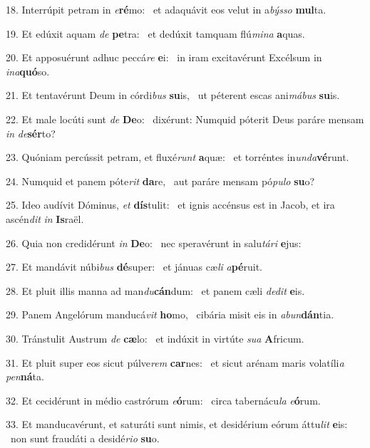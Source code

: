 18. Interrúpit petram in \textit{e}\textbf{ré}mo: \ast\  et adaquávit eos velut in a\textit{býs}\textit{so} \textbf{mul}ta.\

19. Et edúxit aquam \textit{de} \textbf{pe}tra: \ast\  et dedúxit tamquam flú\textit{mi}\textit{na} \textbf{a}quas.\

20. Et apposuérunt adhuc peccá\textit{re} \textbf{e}i: \ast\  in iram excitavérunt Excélsum in \textit{in}\textit{a}\textbf{quó}so.\

21. Et tentavérunt Deum in córdi\textit{bus} \textbf{su}is, \ast\  ut péterent escas ani\textit{má}\textit{bus} \textbf{su}is.\

22. Et male locúti sunt \textit{de} \textbf{De}o: \ast\  dixérunt: Numquid póterit Deus paráre mensam \textit{in} \textit{de}\textbf{sér}to?\

23. Quóniam percússit petram, et fluxé\textit{runt} \textbf{a}quæ: \ast\  et torréntes in\textit{un}\textit{da}\textbf{vé}runt.\

24. Numquid et panem póte\textit{rit} \textbf{da}re, \ast\  aut paráre mensam pó\textit{pu}\textit{lo} \textbf{su}o?\

25. Ideo audívit Dóminus, \textit{et} \textbf{dís}tulit: \ast\  et ignis accénsus est in Jacob, et ira ascén\textit{dit} \textit{in} \textbf{Is}raël.\

26. Quia non credidérunt \textit{in} \textbf{De}o: \ast\  nec speravérunt in salu\textit{tá}\textit{ri} \textbf{e}jus:\

27. Et mandávit núbi\textit{bus} \textbf{dé}super: \ast\  et jánuas cæ\textit{li} \textit{a}\textbf{pé}ruit.\

28. Et pluit illis manna ad man\textit{du}\textbf{cán}dum: \ast\  et panem cæli \textit{de}\textit{dit} \textbf{e}is.\

29. Panem Angelórum manducá\textit{vit} \textbf{ho}mo, \ast\  cibária misit eis in \textit{ab}\textit{un}\textbf{dán}tia.\

30. Tránstulit Austrum \textit{de} \textbf{cæ}lo: \ast\  et indúxit in virtúte \textit{su}\textit{a} \textbf{A}fricum.\

31. Et pluit super eos sicut púlve\textit{rem} \textbf{car}nes: \ast\  et sicut arénam maris volatíli\textit{a} \textit{pen}\textbf{ná}ta.\

32. Et cecidérunt in médio castrórum \textit{e}\textbf{ó}rum: \ast\  circa tabernácu\textit{la} \textit{e}\textbf{ó}rum.\

33. Et manducavérunt, et saturáti sunt nimis, et desidérium eórum áttu\textit{lit} \textbf{e}is: \ast\  non sunt fraudáti a desidé\textit{ri}\textit{o} \textbf{su}o.\

